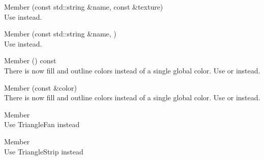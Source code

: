 \begin{DoxyRefList}
\item[Member \doxylink{classsf_1_1_shader_a7f58ab5c0a1084f238dfcec86602daa1}{sf\+::Shader\+::set\+Parameter} (const std\+::string \&name, const \doxylink{classsf_1_1_texture}{Texture} \&texture)]\hfill \\
\label{deprecated__deprecated000019}%
%
Use  instead. 
\item[Member \doxylink{classsf_1_1_shader_af06b4cba0bab915fa01032b063909044}{sf\+::Shader\+::set\+Parameter} (const std\+::string \&name, \doxylink{structsf_1_1_shader_1_1_current_texture_type}{Current\+Texture\+Type})]\hfill \\
\label{deprecated__deprecated000020}%
%
Use  instead. 
\item[Member \doxylink{classsf_1_1_text_ab367e86c9e9e6cd3806c362ab8e79101}{sf\+::Text\+::get\+Color} () const]\hfill \\
\label{deprecated__deprecated000022}%
%
There is now fill and outline colors instead of a single global color. Use  or  instead. 
\item[Member \doxylink{classsf_1_1_text_afd1742fca1adb6b0ea98357250ffb634}{sf\+::Text\+::set\+Color} (const \doxylink{classsf_1_1_color}{Color} \&color)]\hfill \\
\label{deprecated__deprecated000021}%
%
There is now fill and outline colors instead of a single global color. Use  or  instead. 
\item[Member \doxylink{group__graphics_gga5ee56ac1339984909610713096283b1ba5338a2c6d922151fe50f235036af8a20}{sf\+::Triangles\+Fan} ]\hfill \\
\label{deprecated__deprecated000008}%
%
Use Triangle\+Fan instead  
\item[Member \doxylink{group__graphics_gga5ee56ac1339984909610713096283b1ba66643dbbb24bbacb405973ed80eebae0}{sf\+::Triangles\+Strip} ]\hfill \\
\label{deprecated__deprecated000007}%
%
Use Triangle\+Strip instead 
\end{DoxyRefList}